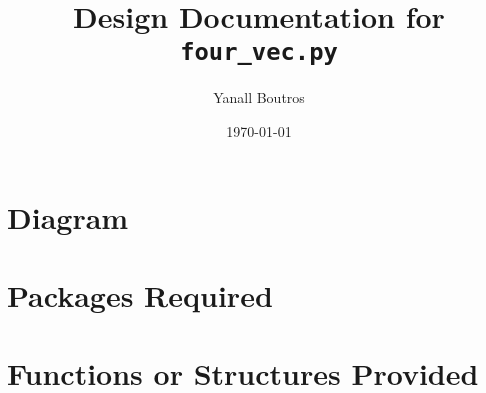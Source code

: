 \documentclass{article}
\begin{document}
\title{Design Documentation for \texttt{four\_vec.py}}
\author{Yanall Boutros}
\date{\today}
\maketitle
\section*{Diagram}
\section*{Packages Required}
\section*{Functions or Structures Provided}
\end{document}
